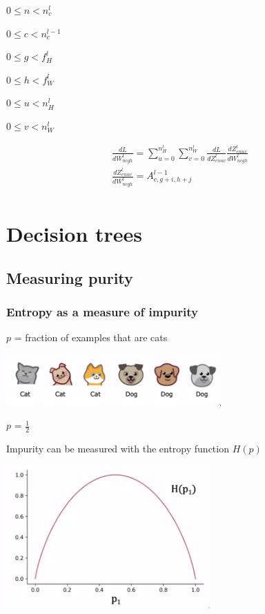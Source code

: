 \documentclass[12pt]{article}
\begin{document}
$0 \le n < n_c^l$

$0 \le c < n_c^{l-1}$

$0 \le g < f_H^l$

$0 \le h < f_W^l$

$0 \le u < n_H^l$

$0 \le v < n_W^l$

\begin{gather*}
    \frac{dL}{dW^l_{ncgh}} = \sum_{u=0}^{n_H^l} \sum_{v=0}^{n_W^l} \frac{dL}{dZ^l_{enuv}}
    \frac{dZ^l_{enuv}}{dW^l_{ncgh}}\\
    \frac{dZ^l_{enuv}}{dW^l_{ncgh}} = A^{l-1}_{c,g+i,h+j}\\
\end{gather*}

\section{Decision trees}

\subsection{Measuring purity}

\subsubsection{Entropy as a measure of impurity}

$p$ = fraction of examples that are cats

\includegraphics{purity}

$p$ = $\frac{1}{2}$

Impurity can be measured with the entropy function $H(p)$

\includegraphics{entropy}
\end{document}
